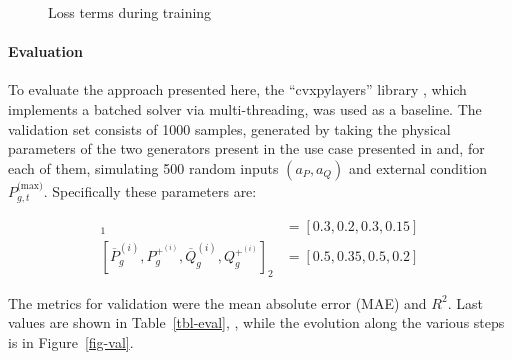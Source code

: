\documentclass[
]{article}
\let\oldparagraph\paragraph
\renewcommand{\paragraph}[1]{\oldparagraph{#1}\mbox{}}
\begin{document}
\begin{figure}


\caption{\label{fig-training}Loss terms during training}

\end{figure}%

\paragraph{Evaluation}\label{evaluation}

To evaluate the approach presented here, the ``cvxpylayers'' library
\citep{agrawalDifferentiableConvexOptimization2019a}, which implements a
batched solver via multi-threading, was used as a baseline. The
validation set consists of 1000 samples, generated by taking the
physical parameters of the two generators present in the use case
presented in \citep{henryGymANMReinforcementLearning2021} and, for each
of them, simulating 500 random inputs \((a_P, a_Q)\) and external
condition \(P^{\textrm{(max)}}_{g,t}\). Specifically these parameters
are:

\begin{align}
    [\overline{P}_g^{(i)},  P_g^{+^{(i)}}, \overline{Q}_g^{(i)},  Q_g^{+^{(i)}}]_1 &= [0.3, 0.2, 0.3, 0.15]\\
    [\overline{P}_g^{(i)},  P_g^{+^{(i)}}, \overline{Q}_g^{(i)},  Q_g^{+^{(i)}}]_2 &= [0.5, 0.35, 0.5, 0.2]
\end{align}

The metrics for validation were the mean absolute error (MAE) and
\(R^2\). Last values are shown in Table~\ref{tbl-eval}, , while the
evolution along the various steps is in Figure~\ref{fig-val}.
\end{document}
